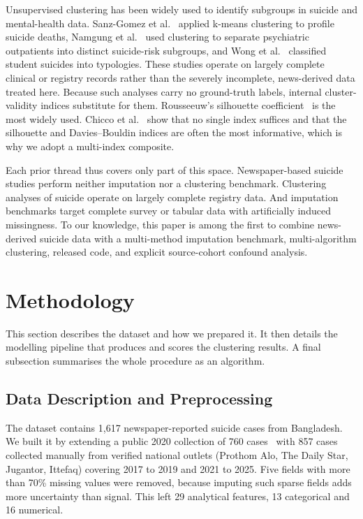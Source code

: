 \documentclass[conference]{IEEEtran}
\begin{document}
Unsupervised clustering has been widely used to identify subgroups in suicide and mental-health data. Sanz-Gomez et al.~\cite{sanzgomez2025impulsivity} applied k-means clustering to profile suicide deaths, Namgung et al.~\cite{namgung2024subgroups} used clustering to separate psychiatric outpatients into distinct suicide-risk subgroups, and Wong et al.~\cite{wong2022studentclusters} classified student suicides into typologies. These studies operate on largely complete clinical or registry records rather than the severely incomplete, news-derived data treated here. Because such analyses carry no ground-truth labels, internal cluster-validity indices substitute for them. Rousseeuw's silhouette coefficient~\cite{rousseeuw1987silhouette} is the most widely used. Chicco et al.~\cite{chicco2025silhouette} show that no single index suffices and that the silhouette and Davies--Bouldin indices are often the most informative, which is why we adopt a multi-index composite.

Each prior thread thus covers only part of this space. Newspaper-based suicide studies perform neither imputation nor a clustering benchmark. Clustering analyses of suicide operate on largely complete registry data. And imputation benchmarks target complete survey or tabular data with artificially induced missingness. To our knowledge, this paper is among the first to combine news-derived suicide data with a multi-method imputation benchmark, multi-algorithm clustering, released code, and explicit source-cohort confound analysis.


\section{Methodology}
\label{sec:Methodology}


This section describes the dataset and how we prepared it. It then details the modelling pipeline that produces and scores the clustering results. A final subsection summarises the whole procedure as an algorithm.

\subsection{Data Description and Preprocessing}
The dataset contains 1{,}617 newspaper-reported suicide cases from Bangladesh. We built it by extending a public 2020 collection of 760 cases~\cite{alom2020bangladesh} with 857 cases collected manually from verified national outlets (Prothom Alo, The Daily Star, Jugantor, Ittefaq) covering 2017 to 2019 and 2021 to 2025. Five fields with more than 70\% missing values were removed, because imputing such sparse fields adds more uncertainty than signal. This left 29 analytical features, 13 categorical and 16 numerical.
\end{document}

